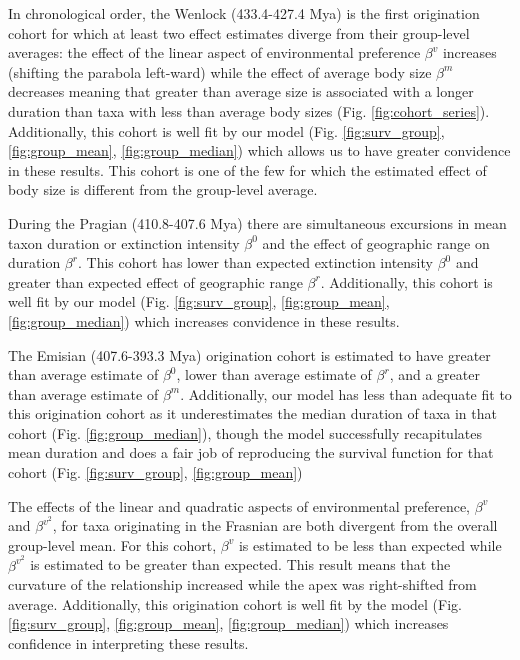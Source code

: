 \documentclass[11pt]{article}
\begin{document}
In chronological order, the Wenlock (433.4-427.4 Mya) is the first origination cohort for which at least two effect estimates diverge from their group-level averages: the effect of the linear aspect of environmental preference \(\beta^{v}\) increases (shifting the parabola left-ward) while the effect of average body size \(\beta^{m}\) decreases meaning that greater than average size is associated with a longer duration than taxa with less than average body sizes (Fig. \ref{fig:cohort_series}). Additionally, this cohort is well fit by our model (Fig. \ref{fig:surv_group}, \ref{fig:group_mean}, \ref{fig:group_median}) which allows us to have greater convidence in these results. This cohort is one of the few for which the estimated effect of body size is different from the group-level average.

During the Pragian (410.8-407.6 Mya) there are simultaneous excursions in mean taxon duration or extinction intensity \(\beta^{0}\) and the effect of geographic range on duration \(\beta^{r}\). This cohort has lower than expected extinction intensity \(\beta^{0}\) and greater than expected effect of geographic range \(\beta^{r}\). Additionally, this cohort is well fit by our model (Fig. \ref{fig:surv_group}, \ref{fig:group_mean}, \ref{fig:group_median}) which increases convidence in these results. %

The Emisian (407.6-393.3 Mya) origination cohort is estimated to have greater than average estimate of \(\beta^{0}\), lower than average estimate of \(\beta^{r}\), and a greater than average estimate of \(\beta^{m}\). Additionally, our model has less than adequate fit to this origination cohort as it underestimates the median duration of taxa in that cohort (Fig. \ref{fig:group_median}), though the model successfully recapitulates mean duration and does a fair job of reproducing the survival function for that cohort (Fig. \ref{fig:surv_group}, \ref{fig:group_mean})

The effects of the linear and quadratic aspects of environmental preference, \(\beta^{v}\) and \(\beta^{v^{2}}\), for taxa originating in the Frasnian are both divergent from the overall group-level mean. For this cohort, \(\beta^{v}\) is estimated to be less than expected while \(\beta^{v^{2}}\) is estimated to be greater than expected. This result means that the curvature of the relationship increased while the apex was right-shifted from average. Additionally, this origination cohort is well fit by the model (Fig. \ref{fig:surv_group}, \ref{fig:group_mean}, \ref{fig:group_median}) which increases confidence in interpreting these results.
\end{document}
